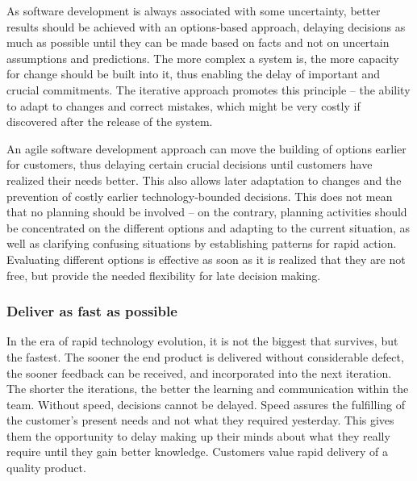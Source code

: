 As software development is always associated with some uncertainty, better results should be achieved with an options-based approach, delaying decisions as much as possible until they can be made based on facts and not on uncertain assumptions and predictions. The more complex a system is, the more capacity for change should be built into it, thus enabling the delay of important and crucial commitments. The iterative approach promotes this principle – the ability to adapt to changes and correct mistakes, which might be very costly if discovered after the release of the system.

An agile software development approach can move the building of options earlier for customers, thus delaying certain crucial decisions until customers have realized their needs better. This also allows later adaptation to changes and the prevention of costly earlier technology-bounded decisions. This does not mean that no planning should be involved – on the contrary, planning activities should be concentrated on the different options and adapting to the current situation, as well as clarifying confusing situations by establishing patterns for rapid action. Evaluating different options is effective as soon as it is realized that they are not free, but provide the needed flexibility for late decision making.

\subsubsection{Deliver as fast as possible}

In the era of rapid technology evolution, it is not the biggest that survives, but the fastest. The sooner the end product is delivered without considerable defect, the sooner feedback can be received, and incorporated into the next iteration. The shorter the iterations, the better the learning and communication within the team. Without speed, decisions cannot be delayed. Speed assures the fulfilling of the customer's present needs and not what they required yesterday. This gives them the opportunity to delay making up their minds about what they really require until they gain better knowledge. Customers value rapid delivery of a quality product.

